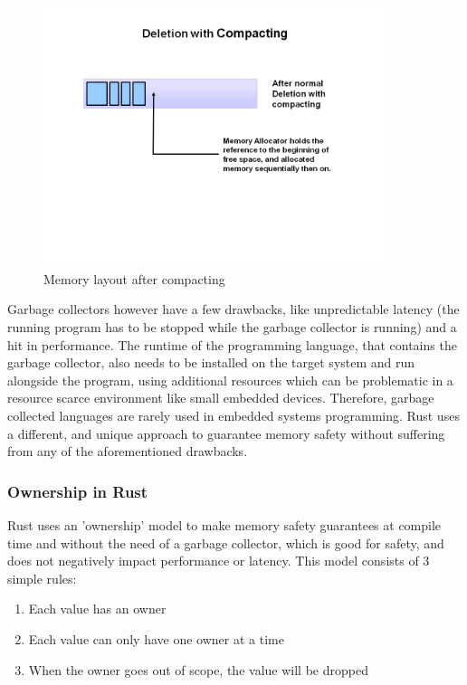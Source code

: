 \begin{figure}[H]
    \centering
    \includegraphics[width=0.9\textwidth]{figures/fundamentals_garbage_collector_compacting.PNG}
    \caption[Illustration: Garbage Collector compacting memory \cite{java_garbage_collector}]{Memory layout after compacting}
    \label{fig:gc_compact}
\end{figure}

Garbage collectors however have a few drawbacks, like unpredictable latency (the running program has to be stopped while the garbage collector is running) and a hit in performance.
The runtime of the programming language, that contains the garbage collector, also needs to be installed on the target system and run alongside the program, using additional
resources which can be problematic in a resource scarce environment like small embedded devices.
Therefore, garbage collected languages are rarely used in embedded systems programming.
Rust uses a different, and unique approach to guarantee memory safety without suffering from any of the aforementioned drawbacks.

\subsubsection{Ownership in Rust}

Rust uses an 'ownership' model \cite{rust_ownership} to make memory safety guarantees at compile time and without the need of a garbage collector,
which is good for safety, and does not negatively impact performance or latency.
This model consists of 3 simple rules:
\begin{enumerate}
    \item Each value has an owner
    \item Each value can only have one owner at a time
    \item When the owner goes out of scope, the value will be dropped
\end{enumerate}

